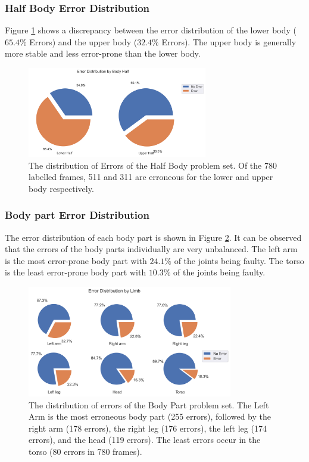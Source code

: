 \subsubsection{Half Body Error Distribution}

Figure \ref{fig:hb_pie} shows a discrepancy between the error distribution of the lower body ($65.4\%$ Errors) and the upper body ($32.4\%$ Errors). The upper body is generally more stable and less error-prone than the lower body.

\begin{figure}[ht]
  \centering
  \includegraphics[width=0.7\textwidth]{figures/Data/dist_half_body/Error_Distribution_by_Body_Half.png}
  \caption[Error Distribution by Body Half]{The distribution of Errors of the Half Body problem set. Of the 780 labelled frames, 511 and 311 are erroneous for the lower and upper body respectively.}
  \label{fig:hb_pie}
\end{figure}

\subsubsection{Body part Error Distribution}

The error distribution of each body part is shown in Figure \ref{fig:lb_pie}. It can be observed that the errors of the body parts individually are very unbalanced. The left arm is the most error-prone body part with $24.1\%$ of the joints being faulty. The torso is the least error-prone body part with $10.3\%$ of the joints being faulty.

\begin{figure}[ht]
  \centering
  \includegraphics[width=0.8\textwidth]{figures/Data/dist_limbs/Error_Distribution_by_Limb.png}
  \caption[Error Distribution by Body part]{The distribution of errors of the Body Part problem set. The Left Arm is the most erroneous body part (255 errors), followed by the right arm (178 errors), the right leg (176 errors), the left leg (174 errors), and the head (119 errors). The least errors occur in the torso (80 errors in 780 frames).}
  \label{fig:lb_pie}
\end{figure}

